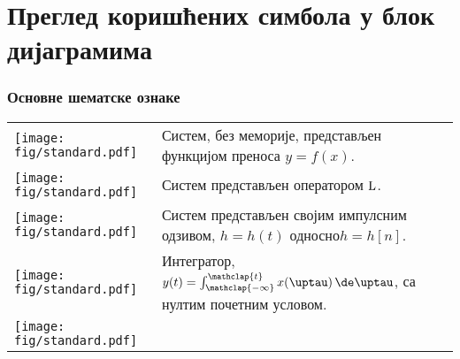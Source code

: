
\chapter{Преглед коришћених симбола у блок дијаграмима} \label{a:blok}

\subsection*{Основне шематске ознаке}

\noindent
\begin{tabular}{ll}
    \begin{minipage}{0.1\textwidth}
        \texttt{[image: fig/standard.pdf]}     
    \end{minipage}
    & 
    \begin{minipage}{0.8\textwidth}
        Систем, без меморије, представљен функцијом преноса $y = f(x)$.
    \end{minipage}
    \\[5mm]
    \begin{minipage}{0.1\textwidth}
        \texttt{[image: fig/standard.pdf]}     
    \end{minipage}
    & 
    \begin{minipage}{0.8\textwidth}
        Систем представљен оператором $\rm L$. 
    \end{minipage}
    \\[5mm]
    \begin{minipage}{0.1\textwidth}
        \texttt{[image: fig/standard.pdf]}     
    \end{minipage}
    & 
    \begin{minipage}{0.8\textwidth}
        Систем представљен својим импулсним одзивом, $h = h(t)$ односно\linebreak $h = h[n]$.
    \end{minipage}
    \\[5mm]
    \begin{minipage}{0.1\textwidth}
        \texttt{[image: fig/standard.pdf]}     
    \end{minipage}
    & 
    \begin{minipage}{0.8\textwidth}
        Интегратор, $y(t) = \int_{\mathclap{-\infty}}^{\mathclap{t}} x(\uptau) \, \de\uptau$,
        са нултим почетним условом.
    \end{minipage}
    \\[5mm]
    \begin{minipage}{0.1\textwidth}
        \texttt{[image: fig/standard.pdf]}     

\end{minipage}
\end{tabular}
